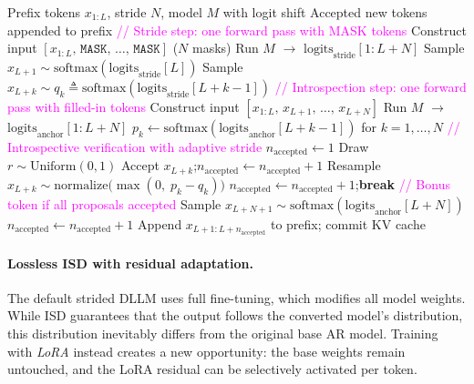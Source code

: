 \begin{algorithm}[t]
\caption{Introspective Strided Decoding (one iteration)}
\label{alg:spec_verify}
\begin{algorithmic}[1]
\REQUIRE Prefix tokens $x_{1:L}$, stride $N$, model $M$ with logit shift
\ENSURE Accepted new tokens appended to prefix
\STATE \textcolor{magenta}{// Stride step: one forward pass with MASK tokens}
\STATE Construct input $[x_{1:L},\, \texttt{MASK},\, \ldots,\, \texttt{MASK}]$ \hfill ($N$ masks)
\STATE Run $M$ $\rightarrow$ $\text{logits}_{\text{stride}}[1{:}L{+}N]$
\STATE Sample $x_{L+1} \sim \text{softmax}(\text{logits}_{\text{stride}}[L])$ \hfill {}
    \STATE Sample $x_{L+k} \sim q_k \triangleq \text{softmax}(\text{logits}_{\text{stride}}[L{+}k{-}1])$ \hfill {}
\ENDFOR
\STATE
\STATE \textcolor{magenta}{// Introspection step: one forward pass with filled-in tokens}
\STATE Construct input $[x_{1:L},\, x_{L+1},\, \ldots,\, x_{L+N}]$
\STATE Run $M$ $\rightarrow$ $\text{logits}_{\text{anchor}}[1{:}L{+}N]$
\STATE $p_k \leftarrow \text{softmax}(\text{logits}_{\text{anchor}}[L{+}k{-}1])$ for $k = 1, \ldots, N$ \hfill {}
\STATE
\STATE \textcolor{magenta}{// Introspective verification with adaptive stride}
\STATE $n_{\text{accepted}} \leftarrow 1$ \hfill {}
    \STATE Draw $r \sim \text{Uniform}(0, 1)$
        \STATE Accept $x_{L+k}$;\quad $n_{\text{accepted}} \leftarrow n_{\text{accepted}} + 1$
    \ELSE
        \STATE Resample $x_{L+k} \sim \text{normalize}\!\big(\max(0,\; p_k - q_k)\big)$
        \STATE $n_{\text{accepted}} \leftarrow n_{\text{accepted}} + 1$;\quad \textbf{break}
    \ENDIF
\ENDFOR
\STATE
\STATE \textcolor{magenta}{// Bonus token if all proposals accepted}
    \STATE Sample $x_{L+N+1} \sim \text{softmax}(\text{logits}_{\text{anchor}}[L{+}N])$
    \STATE $n_{\text{accepted}} \leftarrow n_{\text{accepted}} + 1$
\ENDIF
\STATE
\STATE Append $x_{L+1:L+n_{\text{accepted}}}$ to prefix; commit KV cache
\end{algorithmic}
\end{algorithm}

\paragraph{Lossless ISD with residual adaptation.}
The default strided DLLM uses full fine-tuning, which modifies all model weights. While ISD guarantees that the output follows the converted model's distribution, this distribution inevitably differs from the original base AR model. Training with \emph{LoRA} instead creates a new opportunity: the base weights remain untouched, and the LoRA residual can be selectively activated per token.

